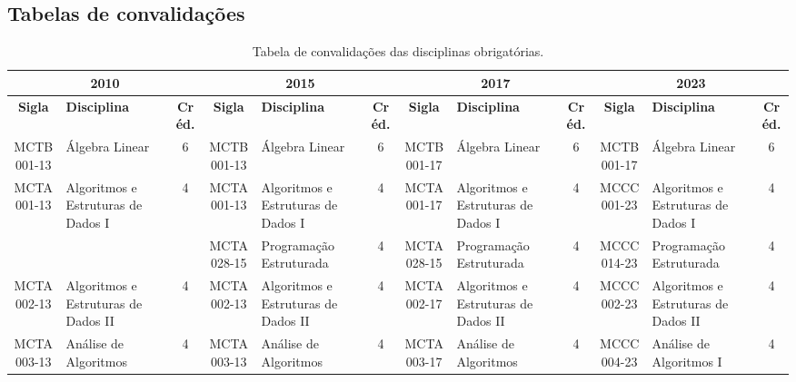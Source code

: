 \documentclass[a4paper]{article}
\begin{document}
\subsection{Tabelas de convalidações}
\label{subsec:convalidacoes}

\begin{landscape}
{\footnotesize
\begin{longtable}{|c|p{.2\textheight}|c||c|p{.2\textheight}|c||c|p{.2\textheight}|c||c|p{.2\textheight}|c|}
    \caption{Tabela de convalidações das disciplinas obrigatórias.}
    \label{tab:convalidacoes_obrigatorias} \\

    \hline
    \multicolumn{3}{|c||}{\bf 2010} & \multicolumn{3}{|c|}{\bf 2015} &
    \multicolumn{3}{|c||}{\bf 2017} & \multicolumn{3}{|c|}{\bf 2023} \\ 
    \hline
    
    \textbf{Sigla} & \textbf{Disciplina} & \textbf{Créd.} & \textbf{Sigla} & \textbf{Disciplina} & \textbf{Créd.} &
    \textbf{Sigla} & \textbf{Disciplina} & \textbf{Créd.} & \textbf{Sigla} & \textbf{Disciplina} & \textbf{Créd.} \\
    \hline\hline
    
    MCTB001-13 & Álgebra Linear & 6 &
    MCTB001-13 & Álgebra Linear & 6 &
    MCTB001-17 & Álgebra Linear & 6 &
    MCTB001-17 & Álgebra Linear & 6 \\ \hline

    MCTA001-13 & Algoritmos e Estruturas de Dados I & 4 &
    MCTA001-13 & Algoritmos e Estruturas de Dados I & 4 & 
    MCTA001-17 & Algoritmos e Estruturas de Dados I & 4 & 
    MCCC001-23 & Algoritmos e Estruturas de Dados I & 4 \\

    & & &
    MCTA028-15 & Programação Estruturada & 4 &
    MCTA028-15 & Programação Estruturada & 4 &
    MCCC014-23 & Programação Estruturada & 4 \\ \hline

    MCTA002-13 & Algoritmos e Estruturas de Dados II & 4 &
    MCTA002-13 & Algoritmos e Estruturas de Dados II & 4 & 
    MCTA002-17 & Algoritmos e Estruturas de Dados II & 4 & 
    MCCC002-23 & Algoritmos e Estruturas de Dados II & 4 \\ \hline

    MCTA003-13 & Análise de Algoritmos & 4 &
    MCTA003-13 & Análise de Algoritmos & 4 &
    MCTA003-17 & Análise de Algoritmos & 4 & 
    MCCC004-23 & Análise de Algoritmos I & 4 \\


\end{longtable}}
\end{landscape}
\end{document}

